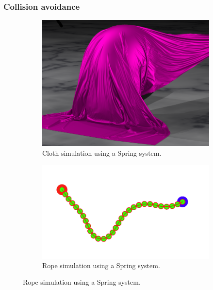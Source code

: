 \subsubsection{Collision avoidance}
\begin{figure}
  \begin{subfigure}[b]{0.4\textwidth}
    \includegraphics[width=\textwidth]{cloth1}
    \caption{Cloth simulation using a Spring system.}
    \label{fig:two}
  \end{subfigure}
  \begin{subfigure}[b]{0.4\textwidth}
    \includegraphics[width=\textwidth]{rope1}
    \caption{Rope simulation using a Spring system.}
    \label{fig:three}
  \end{subfigure}
\end{figure}

